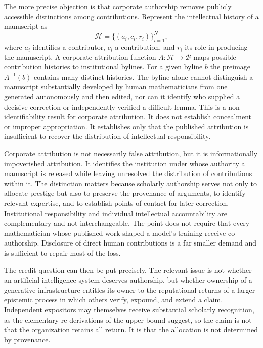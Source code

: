 \documentclass[12pt]{article}
\begin{document}
The more precise objection is that corporate authorship removes publicly accessible distinctions among contributions. Represent the intellectual history of a manuscript as
\begin{equation}
\mathcal H=\{(a_i,c_i,r_i)\}_{i=1}^{N},
\end{equation}
where $a_i$ identifies a contributor, $c_i$ a contribution, and $r_i$ its role in producing the manuscript. A corporate attribution function $A:\mathcal H\to\mathcal B$ maps possible contribution histories to institutional bylines. For a given byline $b$ the preimage $A^{-1}(b)$ contains many distinct histories. The byline alone cannot distinguish a manuscript substantially developed by human mathematicians from one generated autonomously and then edited, nor can it identify who supplied a decisive correction or independently verified a difficult lemma. This is a non-identifiability result for corporate attribution. It does not establish concealment or improper appropriation. It establishes only that the published attribution is insufficient to recover the distribution of intellectual responsibility.

Corporate attribution is not necessarily false attribution, but it is informationally impoverished attribution. It identifies the institution under whose authority a manuscript is released while leaving unresolved the distribution of contributions within it. The distinction matters because scholarly authorship serves not only to allocate prestige but also to preserve the provenance of arguments, to identify relevant expertise, and to establish points of contact for later correction. Institutional responsibility and individual intellectual accountability are complementary and not interchangeable. The point does not require that every mathematician whose published work shaped a model's training receive co-authorship. Disclosure of direct human contributions is a far smaller demand and is sufficient to repair most of the loss.

The credit question can then be put precisely. The relevant issue is not whether an artificial intelligence system deserves authorship, but whether ownership of a generative infrastructure entitles its owner to the reputational returns of a larger epistemic process in which others verify, expound, and extend a claim. Independent expositors may themselves receive substantial scholarly recognition, as the elementary re-derivations of the upper bound suggest, so the claim is not that the organization retains all return. It is that the allocation is not determined by provenance.
\end{document}
